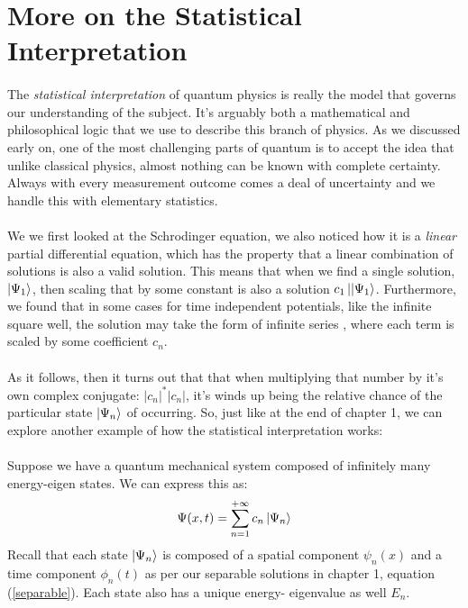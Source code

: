 \documentclass[12pt,letterpaper]{book}
\begin{document}
\section{More on the Statistical Interpretation}

\paragraph*{}The \textit{statistical interpretation} of quantum physics is really the model that governs our understanding of the subject. It's arguably both a mathematical and philosophical logic that we use to describe this branch of physics. As we discussed early on, one of the most challenging parts of quantum is to accept the idea that unlike classical physics, almost nothing can be known with complete certainty. Always with every measurement outcome comes a deal of uncertainty and we handle this with elementary statistics.

\paragraph*{}We we first looked at the Schrodinger equation, we also noticed how it is a \textit{linear} partial differential equation, which has the property that a linear combination of solutions is also a valid solution. This means that when we find a single solution, $\ket{\Psi_1}$, then scaling that by some constant is also a solution $c_1\ket{|\Psi_1}$. Furthermore, we found that in some cases for time independent potentials, like the infinite square well, the solution may take the form of infinite series , where each term is scaled by some coefficient $c_n$. 

\paragraph*{}As it follows, then it turns out that that when multiplying that number by it's own complex conjugate: $|c_n|^*|c_n|$, it's winds up being the relative chance of the particular state $\ket{\Psi_n}$ of occurring. So, just like at the end of chapter 1, we can explore another example of how the statistical interpretation works: 

\paragraph*{}Suppose we have a quantum mechanical system composed of infinitely many energy-eigen states. We can express this as:
\begin{equation}
\Psi(x,t) = \sum_{n=1}^{+\infty} c_n \ket{\Psi_n}
\end{equation}
Recall that each state $\ket{\Psi_n}$ is composed of a spatial component $\psi_n(x)$ and a time component $\phi_n(t)$ as per our separable solutions in chapter 1, equation (\ref{separable}). Each state also has a unique energy- eigenvalue as well $E_n$.
\end{document}

